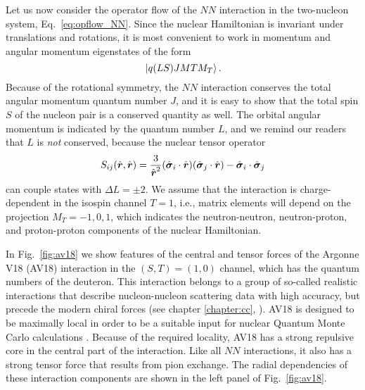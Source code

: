 Let us now consider the operator flow of the $NN$ interaction
in the two-nucleon system, Eq.~\eqref{eq:opflow_NN}. Since the nuclear Hamiltonian is invariant
under translations and rotations, it is most convenient to work in
momentum and angular momentum eigenstates of the form
\begin{equation}
  \,|{q(LS)JMTM_T}\rangle\,.
\end{equation}
Because of the rotational symmetry, the $NN$ interaction conserves
the total angular momentum quantum number $J$, and it is easy to show 
that the total spin $S$ of the nucleon pair is a conserved quantity as 
well. The
orbital angular momentum is indicated by the quantum number $L$,
and we remind our readers that $L$ is \emph{not} conserved, because
the nuclear tensor operator
\begin{equation}
  S_{ij}(\rOV,\rOV) = \frac{3}{\rOV^2}(\sigmaOV_i\cdot\rOV)(\sigmaOV_j\cdot\rOV)-\sigmaOV_i\cdot\sigmaOV_{j}
\end{equation}
can couple states with $\Delta L = \pm 2$. We
assume that the interaction is charge-dependent in the isospin channel
$T=1$, i.e., matrix elements will depend on the projection $M_T=-1,0,1$, 
which indicates the neutron-neutron, neutron-proton, and proton-proton 
components of the nuclear Hamiltonian. 


In Fig.~\ref{fig:av18} we show features of the central 
and tensor forces of the Argonne V18 (AV18) interaction \cite{Wiringa:1995or}
in the $(S,T)=(1,0)$ channel, which has the quantum numbers of the deuteron. This 
interaction belongs to a group of so-called
realistic interactions that describe nucleon-nucleon scattering data
with high accuracy, but precede the modern chiral forces (see
chapter \ref{chapter:cc}, \cite{Epelbaum:2009ve,Machleidt:2011bh}). AV18
is designed to be maximally local in order to be a suitable input for
nuclear Quantum Monte Carlo calculations \cite{Carlson:2015lq,Gezerlis:2014zr,
Lynn:2016ec}. Because of the required locality, AV18 has a strong repulsive
core in the central part of the interaction. Like all $NN$ interactions,
it also has a strong tensor force that results from pion exchange. The
radial dependencies of these interaction components are shown in the left
panel of Fig.~\ref{fig:av18}. 

